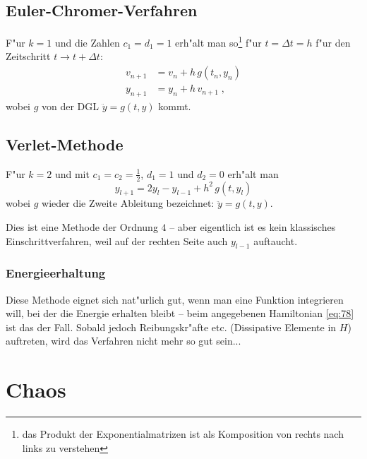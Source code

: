 \documentclass[a4paper]{book}
\begin{document}
\subsection{Euler-Chromer-Verfahren}
\label{sec:euler_chromer_verfahren}

F"ur $k=1$ und die Zahlen $c_1 = d_1 = 1$ erh"alt man so\footnote{das
  Produkt der Exponentialmatrizen ist als Komposition von rechts nach
  links zu verstehen} f"ur $t = \Delta t = h$ f"ur den Zeitschritt $t \to t+\Delta t$:
\begin{align}
  \label{eq:83}
  v_{n+1} &= v_n + h \, g( t_n , y_n ) \\
  y_{n+1} &= y_{n} + h \, v_{n+1}  \;,
\end{align}
wobei $g$  von der DGL $\ddot y = g(t, y)$
kommt.


\subsection{Verlet-Methode}
\label{sec:verlet_methode}

F"ur $k=2$ und mit $c_1 = c_2 = \frac{1}{2}$, $d_1 = 1$ und $d_2 = 0$
erh"alt man
\begin{equation}
  \label{eq:82}
  y_{l+1} = 2 y_l - y_{l-1} + h^2 \, g(t,y_l)
\end{equation}
wobei $g$ wieder die Zweite Ableitung bezeichnet: $\ddot y = g(t,y)$.

Dies ist eine Methode der Ordnung $4$ -- aber eigentlich ist es kein
klassisches Einschrittverfahren, weil auf der rechten Seite auch
$y_{l-1}$ auftaucht.







\subsubsection{Energieerhaltung}
\label{sec:energieerhaltung}

Diese Methode eignet sich nat"urlich gut, wenn man eine Funktion
integrieren will, bei der die Energie erhalten bleibt -- beim
angegebenen Hamiltonian \eqref{eq:78} ist das der Fall. Sobald jedoch
Reibungskr"afte etc. (Dissipative Elemente in $H$) auftreten, wird das
Verfahren nicht mehr so gut sein...




\section{Chaos}
\label{sec:chaos}
\end{document}
